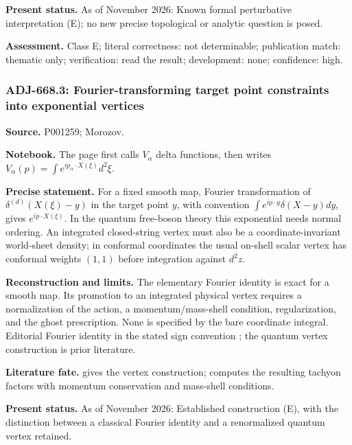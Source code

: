 \noindent\textbf{Present status.} As of November 2026: Known formal perturbative interpretation (E); no new precise topological or analytic question is posed.\par

\noindent\textbf{Assessment.} Class E; literal correctness: not determinable; publication match: thematic only; verification: read the result; development: none; confidence: high.\par

\subsubsection{ADJ-668.3: Fourier-transforming target point constraints into exponential vertices}
\noindent\textbf{Source.} P001259; Morozov.\par
\noindent\textbf{Notebook.} The page first calls \(V_\alpha\) delta functions, then writes \(V_\alpha(p)=\int e^{ip_\alpha\cdot X(\xi)}d^2\xi\).\par

\noindent\textbf{Precise statement.} For a fixed smooth map, Fourier transformation of \(\delta^{(d)}(X(\xi)-y)\) in the target point \(y\), with convention \(\int e^{ip\cdot y}\delta(X-y)dy\), gives \(e^{ip\cdot X(\xi)}\). In the quantum free-boson theory this exponential needs normal ordering. An integrated closed-string vertex must also be a coordinate-invariant world-sheet density; in conformal coordinates the usual on-shell scalar vertex has conformal weights \((1,1)\) before integration against \(d^2z\).\par

\noindent\textbf{Reconstruction and limits.} The elementary Fourier identity is exact for a smooth map. Its promotion to an integrated physical vertex requires a normalization of the action, a momentum/mass-shell condition, regularization, and the ghost prescription. None is specified by the bare coordinate integral. Editorial Fourier identity in the stated sign convention \oursComputed; the quantum vertex construction is prior literature.\par

\noindent\textbf{Literature fate.} \citet[eqs.~(26)--(31)]{polyakov1981quantum} gives the vertex construction; \citet[\S6, (6.21)--(6.26)]{belavinknizhnik1986complex} computes the resulting tachyon factors with momentum conservation and mass-shell conditions.\par

\noindent\textbf{Present status.} As of November 2026: Established construction (E), with the distinction between a classical Fourier identity and a renormalized quantum vertex retained.\par


